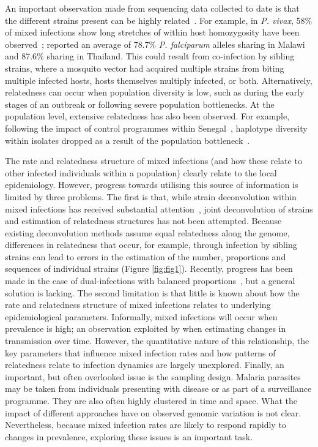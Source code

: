 \documentclass[9pt,lineno]{elife}
\begin{document}
An important observation made from sequencing data collected to date is that the different strains present can be highly related~\citep{Nair2014, Trevino2017}.  For example, in {\it P. vivax}, 58\% of mixed infections show long stretches of within host homozygosity have been observed~\citep{Pearson2016}; \citet{Nkhoma2012} reported an average of 78.7\% {\it P. falciparum} alleles sharing in Malawi and 87.6\% sharing in Thailand. This could result from co-infection by sibling strains, where a mosquito vector had acquired multiple strains from biting multiple infected hosts, hosts themselves multiply infected, or both.  Alternatively, relatedness can occur when population diversity is low, such as during the early stages of an outbreak or following severe population bottlenecks.  At the population level, extensive relatedness has also been observed.  For example, following the impact of control programmes within Senegal~\citep{Mouzin2010}, haplotype diversity within isolates dropped as a result of the population bottleneck~\citep{Wong2017}.

The rate and relatedness structure of mixed infections (and how these relate to other infected individuals within a population) clearly relate to the local epidemiology.  However, progress towards utilising this source of information is limited by three problems.  The first is that, while strain deconvolution within mixed infections has received substantial attention~\citep{Galinsky2015, Jack2016, Chang2017}, joint deconvolution of strains and estimation of relatedness structures has not been attempted.  Because existing deconvolution methods assume equal relatedness along the genome, differences in relatedness that occur, for example, through infection by sibling strains can lead to errors in the estimation of the number, proportions and sequences of individual strains (Figure \ref{fig:fig1}).  Recently, progress has been made in the case of dual-infections with balanced proportions~\citep{Henden2016}, but a general solution is lacking.  The second limitation is that little is known about how the rate and relatedness structure of mixed infections relates to underlying epidemiological parameters.  Informally, mixed infections will occur when prevalence is high; an observation exploited by \citet{Cerqueira2017} when estimating changes in transmission over time.  However, the quantitative nature of this relationship, the key parameters that influence mixed infection rates and how patterns of relatedness relate to infection dynamics are largely unexplored.  Finally, an important, but often overlooked issue is the sampling design.  Malaria parasites may be taken from individuals presenting with disease or as part of a surveillance programme.  They are also often highly clustered in time and space.  What the impact of different approaches have on observed genomic variation is not clear.  Nevertheless, because mixed infection rates are likely to respond rapidly to changes in prevalence, exploring these issues is an important task.
\end{document}
